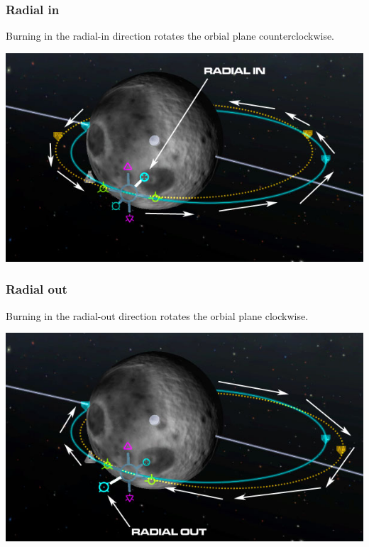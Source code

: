 \begin{frame}
    \frametitle{Radial in}
    \begin{block}{}
        Burning in the radial-in direction rotates the orbial plane counterclockwise.
    \end{block}
    \begin{center}
        \includegraphics[scale=0.5]{images/radial_in}
    \end{center}
\end{frame}
\begin{frame}
    \frametitle{Radial out}
    \begin{block}{}
        Burning in the radial-out direction rotates the orbial plane clockwise.
    \end{block}
    \begin{center}
        \includegraphics[scale=0.5]{images/radial_out}
    \end{center}
\end{frame}
